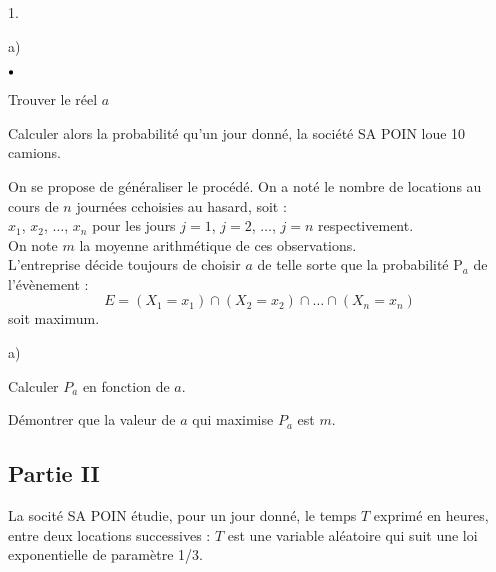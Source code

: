 \documentclass[11pt]{article}%
\begin{document}
\begin{noliste}{1.}
\begin{noliste}{a)}
\begin{noliste}{$\scriptstyle \bullet$}
\item Trouver le réel $a$

\item Calculer alors la probabilité qu'un jour donné, la société SA
POIN
loue 10 camions.
\end{noliste}
\end{noliste}

\item On se propose de généraliser le procédé. On a noté le nombre de
locations au cours de $n$ journées cchoisies au hasard, soit :\\
$x_{1}$, $x_{2}$, $\ldots $, $x_{n}$ pour les jours $j = 1$, $j = 2$,
$\ldots $, 
$j = n$ respectivement.\\
On note $m$ la moyenne arithmétique de ces observations.\\
L'entreprise décide toujours de choisir $a$ de telle sorte que la
probabilité
P$_{a}$ de l'évènement : 
\[
E = (X_{1} = x_{1})\cap (X_{2} = x_{2})\cap \ldots \cap (X_{n} = x_{n})
\]
soit maximum.

\begin{noliste}{a)}
 \setlength{\itemsep}{2mm}
\item Calculer $P_{a}$ en fonction de $a$.

\item Démontrer que la valeur de $a$ qui maximise $P_{a}$ est $m$.
\end{noliste}
\end{noliste}

\subsection*{\textbf{Partie II}}

La socité SA POIN étudie, pour un jour donné, le temps $T$ exprimé en
heures, entre deux locations successives : $T$ est une variable
aléatoire qui
suit une loi exponentielle de paramètre 1/3.
\end{document}
